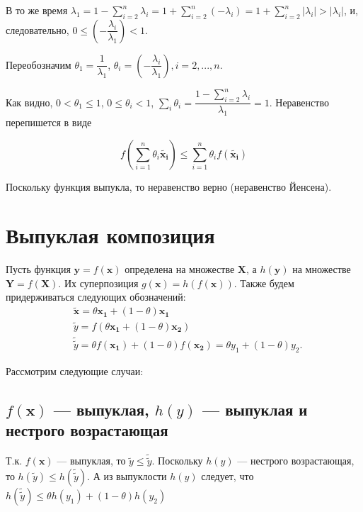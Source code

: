 	В то же время $\lambda_1 = 1 - \sum\limits_{i=2}^{n}\lambda_i = 1 +
	\sum\limits_{i=2}^{n}(-\lambda_i) = 1 + \sum\limits_{i=2}^{n}\left|
	\lambda_i\right| > \left| \lambda_i\right|$, и, следовательно, $0 \leqslant
	(-\dfrac{\lambda_i}{\lambda_1}) < 1$.
	
	Переобозначим $\theta_1 = \dfrac{1}{\lambda_1}$, $\theta_i =
	(-\dfrac{\lambda_i}{\lambda_1}), i=2,...,n$. 
	
	Как видно, $0<\theta_1 \leqslant 1$, $0 \leqslant \theta_i < 1$, $\sum\limits_i
	\theta_i = \dfrac{1 - \sum\limits_{i=2}^{n}\lambda_i}{\lambda_1}=1$. Неравенство
	перепишется в виде
	
	\begin{equation}
	f( \sum\limits_{i=1}^{n} \theta_i \mathbf{\tilde{x_i}})  \leqslant
	\sum\limits_{i=1}^{n} \theta_i  f(\mathbf{\tilde{x_i}})
	\end{equation}
	
	Поскольку функция выпукла, то неравенство верно (неравенство Йенсена).
	
	\section{Выпуклая композиция}
	
	Пусть функция $\mathbf{y} = f(\mathbf{x})$ определена на множестве
	$\mathbf{X}$, а $h(\mathbf{y})$ на множестве $\mathbf{Y} = f(\mathbf{X})$. Их суперпозиция $g(\mathbf{x}) = h(f(\mathbf{x}))$. Также
	будем придерживаться следующих обозначений:
	\begin{equation}
	\begin{split}
	 &\mathbf{\tilde{x}} = \theta
	\mathbf{x_1} + (1-\theta )\mathbf{x_1}\\
	&\tilde{y} = f(\theta \mathbf{x_1} +
	(1-\theta )\mathbf{x_2})\\
	 &\tilde{\tilde{y}} = \theta  f(\mathbf{x_1})
	+ (1-\theta )f(\mathbf{x_2}) =\theta  y_1 + (1-\theta )y_2  . 
	\end{split}
	\end{equation}
	
	Рассмотрим следующие случаи:
	
	\subsection{$f(\mathbf{x})$ --- выпуклая, $h(y)$ --- выпуклая и нестрого
		возрастающая}
	
	Т.к. $f(\mathbf{x})$ --- выпуклая, то $\tilde{y} \leqslant \tilde{\tilde{y}}$.
	Поскольку $h(y)$ --- нестрого возрастающая, то $ h(\tilde{y}) \leqslant
	h({\tilde{\tilde{y}}})$. А из выпуклости $h(y)$ следует, что
	$h(\tilde{\tilde{y}}) \leqslant \theta h(y_1) + (1 - \theta) h(y_2)$
	

